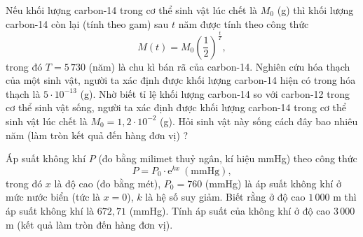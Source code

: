 \begin{ex}%
Nếu khối lượng carbon-14 trong cơ thể sinh vật lúc chết là $M_0$ (g) thì khối lượng carbon-14 còn lại (tính theo gam) sau $t$ năm được tính theo công thức
\[M(t)=M_0\left(\dfrac{1}{2}\right)^{\tfrac{t}{T}},
\]
trong đó $T=5\,730$ (năm) là chu kì bán rã của carbon-14. Nghiên cứu hóa thạch của một sinh vật, người ta xác định được khối lượng carbon-14 hiện có trong hóa thạch là $5\cdot 10^{-13}$ (g).
Nhờ biết tỉ lệ khối lượng carbon-14 so với carbon-12 trong cơ thể sinh vật sống, người ta xác định được khối lượng carbon-14 trong cơ thể sinh vật lúc chết là $M_0=1{,}2\cdot 10^{-2}$ (g). Hỏi sinh vật này sống cách đây bao nhiêu năm (làm tròn kết quả đến hàng đơn vị) ?
\par
{}
\end{ex}

\begin{ex}%
Áp suất không khí $P$ (đo bằng milimet thuỷ ngân, kí hiệu mmHg) theo công thức
\[P=P_0\cdot \mathrm{e}^{kx}\ (\text{mmHg}),
\]
trong đó $x$ là độ cao (đo bằng mét), $P_0=760$ (mmHg) là áp suất không khí ở mức nước biển (tức là $x=0$), $k$ là hệ số suy giảm. Biết rằng ở độ cao $1\,000$ m thì áp suất không khí là $672{,}71$ (mmHg). Tính áp suất của không khí ở độ cao $3\,000$ m (kết quả làm tròn đến hàng đơn vị).
\end{ex}

